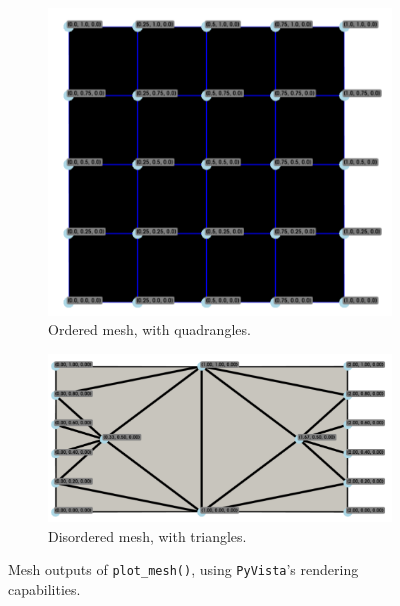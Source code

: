 \begin{figure}[H]
    \centering
    \hfill
    \begin{subfigure}[c]{0.3\textwidth}
        \centering
        \includegraphics[width=\textwidth]{figures/PyVistaMesh_Customized.png}
        \caption{Ordered mesh, with quadrangles.}
        \label{fig:PyVistaMesh1}
    \end{subfigure}
    \hspace{0.1\textwidth}
    \begin{subfigure}[c]{0.4\textwidth}
        \centering
        \includegraphics[width=\textwidth]{figures/PyVistaMesh_Customized2.png}
        \caption{Disordered mesh, with triangles.}
        \label{fig:PyVistaMesh2}
    \end{subfigure}
    \caption{Mesh outputs of \texttt{plot\_mesh()}, using \texttt{PyVista}'s rendering capabilities.}
    \label{fig:PyVistaMesh}
    \hfill
\end{figure}

